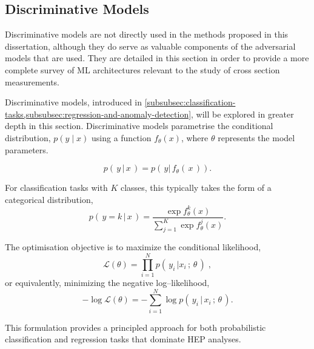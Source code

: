     
        \subsection{Discriminative Models}
        
        \begin{note*}
            Discriminative models are not directly used in the methods proposed in this dissertation, although they do serve as valuable components of the adversarial models that are used. They are detailed in this section in order to provide a more complete survey of ML architectures relevant to the study of cross section measurements.
        \end{note*}
        
            Discriminative models, introduced in \cref{subsubsec:classification-tasks,subsubsec:regression-and-anomaly-detection}, will be explored in greater depth in this section.
            Discriminative models parametrise the conditional distribution, \(p(y\mid x)\) using a function \(f_\theta(x)\), where \(\theta\) represents the model parameters.
            
            \begin{equation}
                p(\,y\,|\,x\,) = p(\,y|\,f_\theta(\,x\,)).
            \end{equation}
            
            For classification tasks with \(K\) classes, this typically takes the form of a categorical distribution,
            \begin{equation}
                p(\,y=k\,|\,x\,) = \frac{\exp f_\theta^k(x)}{\sum_{j=1}^K \exp f_\theta^j(x)}.
            \end{equation}
            
            The optimisation objective is to maximize the conditional likelihood,
            \begin{equation}
                \mathcal{L}(\theta) = \prod_{i=1}^N p(\,y_i\,|x_i\,;\, \theta\,)\;,
            \end{equation}
            or equivalently, minimizing the negative log--likelihood,
            \begin{equation}
                -\log \mathcal{L}(\theta) = -\sum_{i=1}^N \log p(\,y_i\,|\,x_i\,;\, \theta\,).
            \end{equation}
            
            This formulation provides a principled approach for both probabilistic classification and regression tasks that dominate HEP analyses.
        
